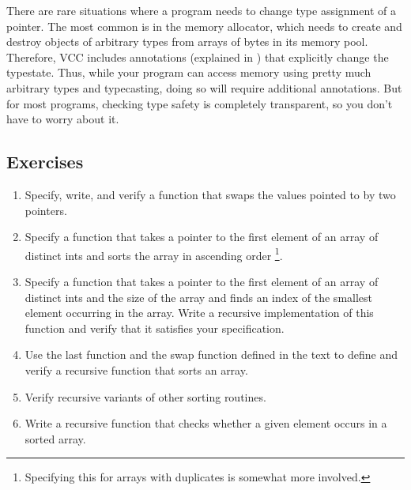 There are rare situations where a program needs to change type
assignment of a pointer.  The most common is in the memory allocator,
which needs to create and destroy objects of arbitrary types from
arrays of bytes in its memory pool. Therefore, VCC includes
annotations (explained in ) that explicitly change the
typestate.  Thus, while your program can access memory using pretty
much arbitrary types and typecasting, doing so will require additional
annotations. But for most programs, checking type safety is completely
transparent, so you don't have to worry about it.

\subsection*{Exercises}
\begin{enumerate}
\item
Specify, write, and verify a function that swaps the values pointed to
by two  pointers.
\item
Specify a function that takes a pointer to the first element of an
array of distinct ints and sorts the array 
in ascending order%
\footnote{Specifying this for arrays with duplicates is somewhat more
  involved.}. 
\item
Specify a function that takes a pointer to the first element of an
array of distinct ints and the size of the array and finds an index of the
smallest element occurring in the array. Write a recursive
implementation of this function and verify that it satisfies your
specification. 
\item
Use the last function and the swap function defined in the text to
define and verify a recursive function that sorts an array. 
\item 
Verify recursive variants of other sorting routines.
\item
Write a recursive function that checks whether a given element occurs
in a sorted array.
\end{enumerate}


